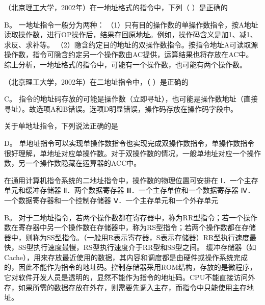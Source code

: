\question （北京理工大学，2002年）在一地址格式的指令中，下列（ ）是正确的
\par{}
\begin{solution}B。 一地址指令一般分为两种：
（1）只有目的操作数的单操作数指令，按A地址读取操作数，进行OP操作后，结果存回原地址。例如，操作码含义是加1、减1、求反、求补等。
（2）隐含约定目的地址的双操作数指令。按指令地址A可读取源操作数，指令可隐含约定另一个操作数由AC提供，运算结果也将存放在AC中。
综上分析，一地址格式的指令中，可能有一个操作数，也可能有两个操作数。
\end{solution}
\question （北京理工大学，2002年）在二地址指令中，（ ）是正确的
\par{}
\begin{solution}C。
指令的地址码存放的可能是操作数（立即寻址），也可能是操作数地址（直接寻址）。故选项A和B错误。选项D明显错误，操作码存放在操作码字段中。
\end{solution}
\question 关于单地址指令，下列说法正确的是
\par{}
\begin{solution}D。
单地址指令可以实现单操作数指令也实现完成双操作数指令，单操作数指令很好理解，单地址对应单操作数。对于双操作数的情况，一般单地址对应一个操作数，另一个操作数隐藏在运算器的ACC中。
\end{solution}
\question 在通用计算机指令系统的二地址指令中，操作数的物理位置可安排在
Ⅰ．一个主存单元和缓冲存储器 Ⅱ．两个数据寄存器
Ⅲ．一个主存单位和一个数据寄存器 Ⅳ．一个数据寄存器和一个控制存储器
Ⅴ．一个主存单元和一个外存单元
\par{}
\begin{solution}B。
对于二地址指令，若两个操作数都在寄存器中，称为RR型指令；若一个操作数在寄存器中另一个操作数在存储器中，称为RS型指令；若两个操作数都在存储器中，则称为SS型指令。（一般用R表示寄存器，S表示存储器）RR型执行速度最快，SS型执行速度最慢，RS型执行速度介于RR型和SS型之间。
缓冲存储器（如Cache），用来存放最近使用的数据，其内容和调度都是由硬件或操作系统完成的，因此不能作为指令的地址码。控制存储器采用ROM结构，存放的是微程序，它对软件开发人员是透明的，显然不能作为指令的地址码。CPU不能直接访问外存，如果所需的数据存放在外存，则需要先调入主存，而指令中只能使用主存地址。
\end{solution}
